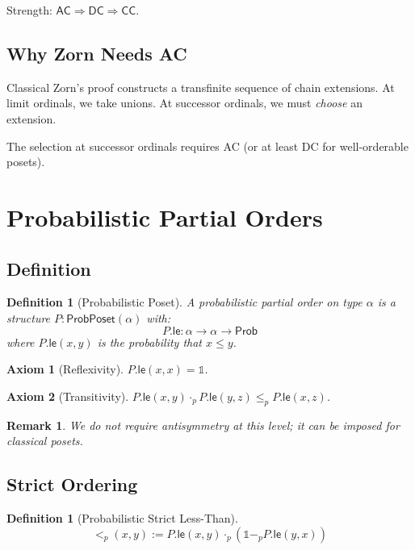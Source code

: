 \documentclass[11pt,a4paper]{article}
\newtheorem{definition}[theorem]{Definition}
\newtheorem{axiom}{Axiom}
\newtheorem{remark}[theorem]{Remark}
\newcommand{\Prob}{\mathsf{Prob}}
\newcommand{\ProbPoset}{\mathsf{ProbPoset}}
\newcommand{\pone}{\mathbb{1}}
\newcommand{\ple}{\leq_p}
\newcommand{\plt}{<_p}
\newcommand{\pmul}{\cdot_p}
\newcommand{\psub}{-_p}
\newcommand{\AC}{\mathsf{AC}}
\newcommand{\DC}{\mathsf{DC}}
\newcommand{\CC}{\mathsf{CC}}
\begin{document}
Strength: $\AC \Rightarrow \DC \Rightarrow \CC$.

\subsection{Why Zorn Needs AC}

Classical Zorn's proof constructs a transfinite sequence of chain extensions. At limit ordinals, we take unions. At successor ordinals, we must \emph{choose} an extension.

The selection at successor ordinals requires AC (or at least DC for well-orderable posets).

\section{Probabilistic Partial Orders}

\subsection{Definition}

\begin{definition}[Probabilistic Poset]
A \emph{probabilistic partial order} on type $\alpha$ is a structure $P : \ProbPoset(\alpha)$ with:
\[
P.\mathsf{le} : \alpha \to \alpha \to \Prob
\]
where $P.\mathsf{le}(x, y)$ is the probability that $x \leq y$.
\end{definition}

\begin{axiom}[Reflexivity]
$P.\mathsf{le}(x, x) = \pone$.
\end{axiom}

\begin{axiom}[Transitivity]
$P.\mathsf{le}(x, y) \pmul P.\mathsf{le}(y, z) \ple P.\mathsf{le}(x, z)$.
\end{axiom}

\begin{remark}
We do not require antisymmetry at this level; it can be imposed for classical posets.
\end{remark}

\subsection{Strict Ordering}

\begin{definition}[Probabilistic Strict Less-Than]
\[
\plt(x, y) := P.\mathsf{le}(x, y) \pmul (\pone \psub P.\mathsf{le}(y, x))
\]
\end{definition}
\end{document}

